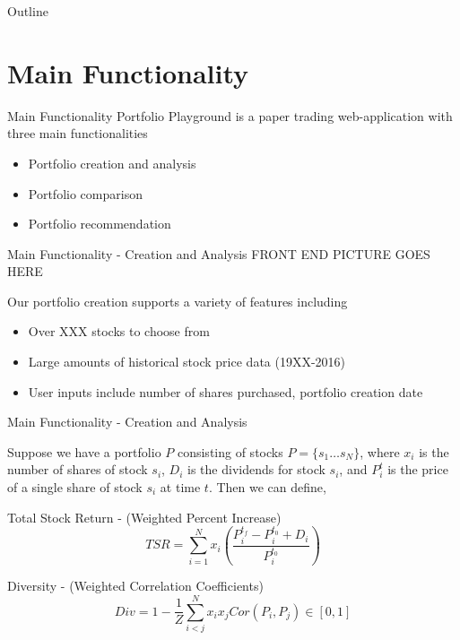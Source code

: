\documentclass{beamer}
\begin{document}
\begin{frame}{Outline}
  \tableofcontents
\end{frame}

\section{Main Functionality}

\begin{frame}{Main Functionality}
Portfolio Playground is a paper trading web-application with three main functionalities \\

	\begin{itemize}
		\item Portfolio creation and analysis
		\item Portfolio comparison
		\item Portfolio recommendation
	\end{itemize}

\end{frame}

\begin{frame}{Main Functionality - Creation and Analysis}
FRONT END PICTURE GOES HERE

Our portfolio creation supports a variety of features including
	\begin{itemize}
		\item Over XXX stocks to choose from
		\item Large amounts of historical stock price data (19XX-2016)
		\item User inputs include number of shares purchased, portfolio creation date
	\end{itemize}
\end{frame}

\begin{frame}{Main Functionality - Creation and Analysis}

Suppose we have a portfolio $P$ consisting of stocks $P = \{s_1\dots s_N\}$, where $x_i$ is the number of shares of stock $s_i$, $D_i$ is the dividends for stock $s_i$, and $P^{t}_{i}$ is the price of a single share of stock $s_i$ at time $t$. Then we can define,

\begin{block}{Total Stock Return - (Weighted Percent Increase)}
$$TSR = \sum_{i=1}^N x_i \left( \frac{P^{t_f}_{i} - P^{t_0}_{i} + D_i}{P^{t_0}_{i}} \right) $$
\end{block}

\begin{block}{Diversity - (Weighted Correlation Coefficients)}
$$Div = 1 - \frac{1}{Z} \sum_{i<j}^N x_i x_j Cor(P_i,P_j) \in \left[ 0,1 \right]$$ 
\end{block}

\end{frame}
\end{document}
